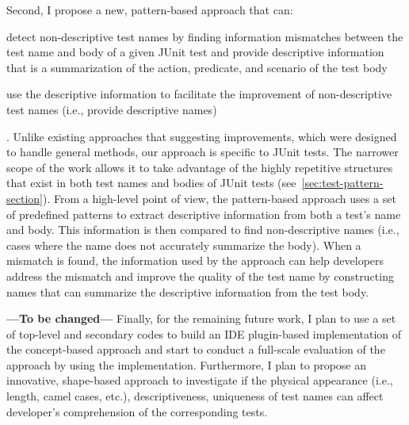 Second, I propose a new, pattern-based approach that can:
\begin{enumerate*}
\item detect non-descriptive test names by finding information mismatches between the test name and body of a given JUnit test and provide descriptive information that is a summarization of the action, predicate, and scenario of the test body
\item use the descriptive information to facilitate the improvement of non-descriptive test names (i.e., provide descriptive names)
\end{enumerate*}.
%
Unlike existing approaches that suggesting improvements, which were designed to handle general methods, our approach is specific to JUnit tests.
%
The narrower scope of the work allows it to take advantage of the highly repetitive structures that exist in both test names and bodies of JUnit tests (see~\cref{sec:test-pattern-section}).
%
From a high-level point of view, the pattern-based approach uses a set of predefined patterns to extract descriptive information from both a test's name and body.
%
This information is then compared to find non-descriptive names (i.e., cases where the name does not accurately summarize the body).
%
When a mismatch is found, the information used by the approach can help developers address the mismatch and improve the quality of the test name by constructing names that can summarize the descriptive information from the test body.


\textbf{---To be changed---}
Finally, for the remaining future work, I plan to use a set of top-level and secondary codes to build an IDE plugin-based implementation of the concept-based approach and start to conduct a full-scale evaluation of the approach by using the implementation.
%
Furthermore, I plan to propose an innovative, shape-based approach to investigate if the physical appearance (i.e., length, camel cases, etc.), descriptiveness, uniqueness of test names can affect developer's comprehension of the corresponding tests.